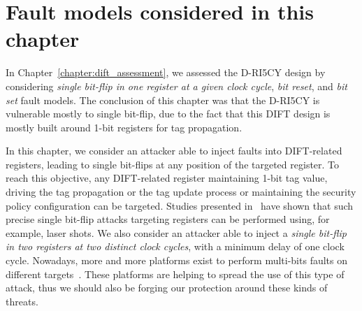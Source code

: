 \section{Fault models considered in this chapter}
In Chapter~\ref{chapter:dift_assessment}, we assessed the D-RI5CY design by considering \textit{single bit-flip in one register at a given clock cycle}, \textit{bit reset}, and \textit{bit set} fault models. The conclusion of this chapter was that the D-RI5CY is vulnerable mostly to single bit-flip, due to the fact that this DIFT design is mostly built around 1-bit registers for tag propagation.

In this chapter, we consider an attacker able to inject faults into DIFT-related registers, leading to single bit-flips at any position of the targeted register. To reach this objective, any DIFT-related register maintaining 1-bit tag value, driving the tag propagation or the tag update process or maintaining the security policy configuration can be targeted. Studies presented in~\cite{ZDCRT-12-dcis,CLFT-14-cosade} have shown that such precise single bit-flip attacks targeting registers can be performed using, for example, laser shots. We also consider an attacker able to inject a \textit{single bit-flip in two registers at two distinct clock cycles}, with a minimum delay of one clock cycle. Nowadays, more and more platforms exist to perform multi-bits faults on different targets~\cite{alphanov-doubleLFI,alphanov-fourLFI}. These platforms are helping to spread the use of this type of attack, thus we should also be forging our protection around these kinds of threats.

